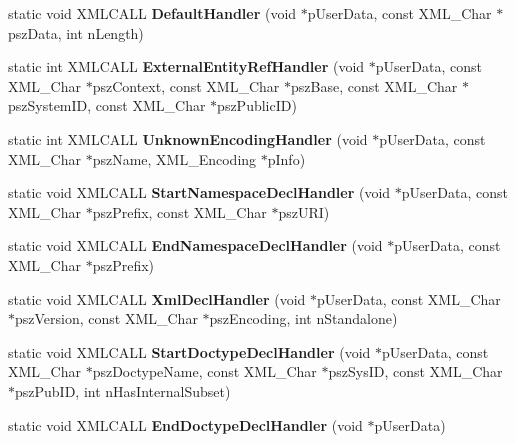 \begin{DoxyCompactItemize}
\item 
\hypertarget{class_c_expat_impl_a7574c23fedf2223d1132c30f39f86973}{static void X\+M\+L\+C\+A\+L\+L {\bfseries Default\+Handler} (void $\ast$p\+User\+Data, const X\+M\+L\+\_\+\+Char $\ast$psz\+Data, int n\+Length)}\label{class_c_expat_impl_a7574c23fedf2223d1132c30f39f86973}

\item 
\hypertarget{class_c_expat_impl_a7ffd009e74665bd8a0bf0c65f0919c4a}{static int X\+M\+L\+C\+A\+L\+L {\bfseries External\+Entity\+Ref\+Handler} (void $\ast$p\+User\+Data, const X\+M\+L\+\_\+\+Char $\ast$psz\+Context, const X\+M\+L\+\_\+\+Char $\ast$psz\+Base, const X\+M\+L\+\_\+\+Char $\ast$psz\+System\+I\+D, const X\+M\+L\+\_\+\+Char $\ast$psz\+Public\+I\+D)}\label{class_c_expat_impl_a7ffd009e74665bd8a0bf0c65f0919c4a}

\item 
\hypertarget{class_c_expat_impl_ae68c1bc5f3c304c3762dff9194958291}{static int X\+M\+L\+C\+A\+L\+L {\bfseries Unknown\+Encoding\+Handler} (void $\ast$p\+User\+Data, const X\+M\+L\+\_\+\+Char $\ast$psz\+Name, X\+M\+L\+\_\+\+Encoding $\ast$p\+Info)}\label{class_c_expat_impl_ae68c1bc5f3c304c3762dff9194958291}

\item 
\hypertarget{class_c_expat_impl_aaec07b7f5aeeeba999f54d815746f8bc}{static void X\+M\+L\+C\+A\+L\+L {\bfseries Start\+Namespace\+Decl\+Handler} (void $\ast$p\+User\+Data, const X\+M\+L\+\_\+\+Char $\ast$psz\+Prefix, const X\+M\+L\+\_\+\+Char $\ast$psz\+U\+R\+I)}\label{class_c_expat_impl_aaec07b7f5aeeeba999f54d815746f8bc}

\item 
\hypertarget{class_c_expat_impl_a32b1e4f53ae62c7854b926413478cb4d}{static void X\+M\+L\+C\+A\+L\+L {\bfseries End\+Namespace\+Decl\+Handler} (void $\ast$p\+User\+Data, const X\+M\+L\+\_\+\+Char $\ast$psz\+Prefix)}\label{class_c_expat_impl_a32b1e4f53ae62c7854b926413478cb4d}

\item 
\hypertarget{class_c_expat_impl_a560d661c5fb82c1a9657b776021240b7}{static void X\+M\+L\+C\+A\+L\+L {\bfseries Xml\+Decl\+Handler} (void $\ast$p\+User\+Data, const X\+M\+L\+\_\+\+Char $\ast$psz\+Version, const X\+M\+L\+\_\+\+Char $\ast$psz\+Encoding, int n\+Standalone)}\label{class_c_expat_impl_a560d661c5fb82c1a9657b776021240b7}

\item 
\hypertarget{class_c_expat_impl_a74873e367382b438bd8712f2e09d2d52}{static void X\+M\+L\+C\+A\+L\+L {\bfseries Start\+Doctype\+Decl\+Handler} (void $\ast$p\+User\+Data, const X\+M\+L\+\_\+\+Char $\ast$psz\+Doctype\+Name, const X\+M\+L\+\_\+\+Char $\ast$psz\+Sys\+I\+D, const X\+M\+L\+\_\+\+Char $\ast$psz\+Pub\+I\+D, int n\+Has\+Internal\+Subset)}\label{class_c_expat_impl_a74873e367382b438bd8712f2e09d2d52}

\item 
\hypertarget{class_c_expat_impl_a6574d44355c49976885e8589ec7307bb}{static void X\+M\+L\+C\+A\+L\+L {\bfseries End\+Doctype\+Decl\+Handler} (void $\ast$p\+User\+Data)}\label{class_c_expat_impl_a6574d44355c49976885e8589ec7307bb}

\end{DoxyCompactItemize}
